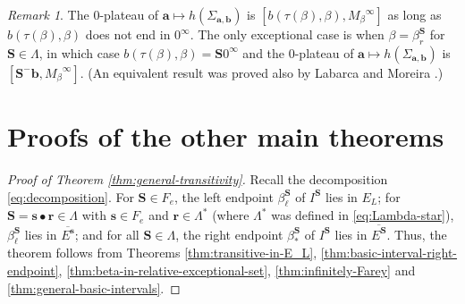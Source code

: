 \documentclass[11pt]{amsart}
\theoremstyle{definition}
\theoremstyle{remark}
\newtheorem{remark}[theorem]{Remark}
\numberwithin{equation}{section}
\renewcommand{\a}{ {\mathbf{a}}}
\renewcommand{\b}{ {\mathbf{b}}}
\newcommand{\s}{ {\mathbf{s}}}
\newcommand{\cs}{ {\mathbf{S}}}
\renewcommand{\r}{ {\mathbf{r}}}
\newcommand{\f}{\infty}
\renewcommand{\a}{ \mathbf{a}}
\newcommand{\La}{\Lambda}
\begin{document}
\begin{remark} \label{rem:zero-plateau}
The $0$-plateau of $\a\mapsto h(\Sigma_{\a,\b})$ is $[b(\tau(\beta),\beta),{M_\beta}^\f]$ as long as $b(\tau(\beta),\beta)$ does not end in $0^\f$. The only exceptional case is when $\beta=\beta_r^\cs$ for $\cs\in\La$, in which case $b(\tau(\beta),\beta)=\cs0^\f$ and the $0$-plateau of $\a\mapsto h(\Sigma_{\a,\b})$ is $[\cs^-\b,{M_\beta}^\f]$. (An equivalent result was proved also by Labarca and Moreira \cite{Labarca-Moreira-2006}.)
\end{remark}


\section{Proofs of the other main theorems} \label{sec:other-proofs}

\begin{proof}[Proof of Theorem \ref{thm:general-transitivity}]
Recall the decomposition \eqref{eq:decomposition}.
For $\cs\in{F_e}$, the left endpoint $\beta_\ell^\cs$ of $I^{\cs}$ lies in $E_L$; for $\cs=\s\bullet\r\in\La$ with $\s\in{F_e}$ and {$\r\in\La^*$ (where $\La^*$ was defined in \eqref{eq:Lambda-star}}), $\beta_\ell^\cs$ lies in $\overline{E^\s}$; and for all $\cs\in\La$, the right endpoint $\beta_*^\cs$ of $I^{\cs}$ lies in $\overline{E^\cs}$.
Thus, the theorem follows from Theorems \ref{thm:transitive-in-E_L}, \ref{thm:basic-interval-right-endpoint}, \ref{thm:beta-in-relative-exceptional-set}, \ref{thm:infinitely-Farey} and \ref{thm:general-basic-intervals}.
\end{proof}

\end{document}
